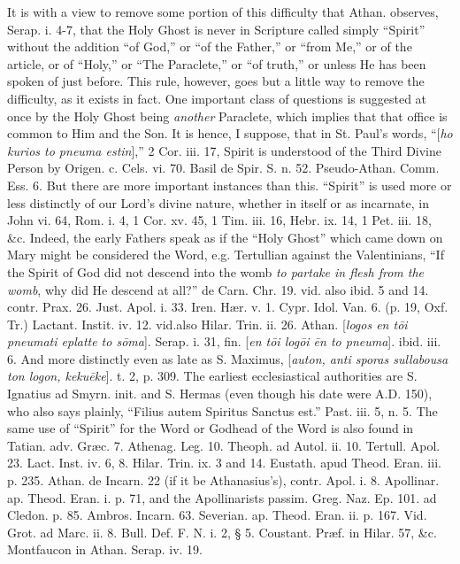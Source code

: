It is with a view to remove some portion of this
difficulty that Athan. observes, Serap. i. 4-7, that the Holy Ghost is
never in Scripture called simply ``Spirit'' without the addition ``of
God,'' or ``of the Father,'' or ``from Me,'' or of the article, or of ``Holy,''
or ``The Paraclete,'' or ``of truth,'' or unless He has been spoken of
just before. This rule, however, goes but a little way to remove the
difficulty, as it exists in fact. One important class of questions is
suggested at once by the Holy Ghost being \emph{another} Paraclete,
which implies that that office is common to Him and the Son. It
is hence, I suppose, that in St. Paul's words, ``[\emph{ho kurios to
pneuma estin}],'' 2 Cor. iii. 17, Spirit is understood of the
Third Divine Person by Origen. c. Cels. vi. 70. Basil de Spir. S. n.
52. Pseudo-Athan. Comm. Ess. 6. But there are more important instances
than this. ``Spirit'' is used more or less distinctly of our Lord's
divine nature, whether in itself or as incarnate, in John vi. 64, Rom.
i. 4, 1 Cor. xv. 45, 1 Tim. iii. 16, Hebr. ix. 14, 1 Pet. iii. 18,
\&c. Indeed, the early Fathers speak as if the ``Holy Ghost'' which
came down on Mary might be considered the Word, e.g. Tertullian
against the Valentinians, ``If the Spirit of God did not descend into
the womb \emph{to partake in flesh from the womb}, why did He descend
at all?'' de Carn. Chr. 19. vid. also ibid. 5 and 14. contr. Prax. 26.
Just. Apol. i. 33. Iren. Hær. v. 1. Cypr. Idol. Van. 6. (p. 19, Oxf.
Tr.) Lactant. Instit. iv. 12. vid.also Hilar. Trin. ii. 26. Athan. [\emph{logos
en t\={o}i pneumati eplatte to s\={o}ma}]. Serap. i. 31, fin.
[\emph{en t\={o}i log\={o}i \={e}n to pneuma}]. ibid. iii. 6.
And more distinctly even as late as S. Maximus, [\emph{auton, anti sporas
sullabousa ton logon, keku\={e}ke}]. t. 2, p. 309. The earliest
ecclesiastical authorities are S. Ignatius ad Smyrn. init. and S.
Hermas (even though his date were A.D.
150), who also says plainly, ``Filius autem Spiritus Sanctus est.''
Past. iii. 5, n. 5. The same use of ``Spirit'' for the Word or Godhead
of the Word is also found in Tatian. adv. Græc. 7. Athenag. Leg. 10.
Theoph. ad Autol. ii. 10. Tertull. Apol. 23. Lact. Inst. iv. 6, 8.
Hilar. Trin. ix. 3 and 14. Eustath. apud Theod. Eran. iii. p. 235.
Athan. de Incarn. 22 (if it be Athanasius's), contr. Apol. i. 8.
Apollinar. ap. Theod. Eran. i. p. 71, and the Apollinarists passim.
Greg. Naz. Ep. 101. ad Cledon. p. 85. Ambros. Incarn. 63. Severian. ap.
Theod. Eran. ii. p. 167. Vid. Grot. ad Marc. ii. 8. Bull. Def. F. N. i.
2, § 5. Coustant. Præf. in Hilar. 57, \&c. Montfaucon in Athan.
Serap. iv. 19.

